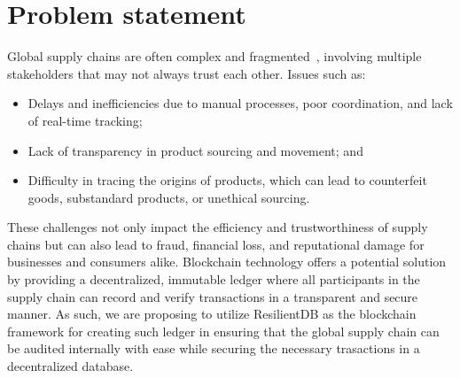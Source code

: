 \section{Problem statement}

Global supply chains are often complex and fragmented~\cite{hbrSupplychain}, involving multiple stakeholders that may not always trust each other. Issues such as:
\begin{itemize}
    \item Delays and inefficiencies due to manual processes, poor coordination, and lack of real-time tracking;
    \item Lack of transparency in product sourcing and movement; and
    \item Difficulty in tracing the origins of products, which can lead to counterfeit goods, substandard products, or unethical sourcing.
\end{itemize}
These challenges not only impact the efficiency and trustworthiness of supply chains but can also lead to fraud, financial loss, and reputational damage for businesses and consumers alike.
Blockchain technology offers a potential solution by providing a decentralized, immutable ledger where all participants in the supply chain can record and verify transactions in a transparent and secure manner.
As such, we are proposing to utilize ResilientDB as the blockchain framework for creating such
ledger in ensuring that the global supply chain can be audited internally with ease while securing
the necessary trasactions in a decentralized database.
